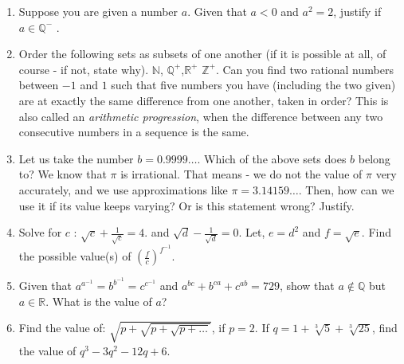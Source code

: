 \documentclass[8pt]{extarticle}
\begin{document}
\begin{enumerate}
\item Suppose you are given a number $a$. Given that $a<0$ and $a^2 = 2$, justify if $a \in \mathbb{Q^-}$ .
\item Order the following sets as subsets of one another (if it is possible at all, of course - if not, state why). $\mathbb{N}$, $\mathbb{Q^+}$,$\mathbb{R^+}$ $\mathbb{Z^+}$. Can you find two rational numbers between $-1$ and $1$ such that five numbers you have (including the two given) are at exactly the same difference from one another, taken in order? This is also called an \textit{arithmetic progression}, when the difference between any two consecutive numbers in a sequence is the same.
\item Let us take the number $b = 0.9999 \ldots$. Which of the above sets does $b$ belong to? We know that $\pi$ is irrational. That means - we do not the value of $\pi$ very accurately, and we use approximations like $\pi = 3.14159\ldots$. Then, how can we use it if its value keeps varying? Or is this statement wrong? Justify.
\item Solve for $c$ : $\sqrt{c} + \frac{1}{\sqrt{c}} = 4. $ and  $\sqrt{d} - \frac{1}{\sqrt{d}} = 0. $ Let, $e=d^2$ and $f=\sqrt{e}$. Find the possible value(s) of ${ \left( \frac{f}{c} \right)}^{f^{-1}}$.
\item Given that $a^{a^{-1}} = b^{b^{-1}} = c^{c^{-1}}$ and $a^{bc} + b^{ca} + c^{ab} = 729$, show that $a \notin \mathbb{Q}$ but $a \in \mathbb{R}$. What is the value of $a$?
\item Find the value of: $\sqrt{p + \sqrt{p + \sqrt{p + \ldots}}}$, if $p = 2$. If $q = 1 + \sqrt[3]{5} + \sqrt[3]{25}$, find the value of $q^3 - 3q^2 - 12q + 6$.
\end{enumerate}

\end{document}
